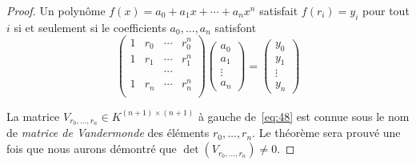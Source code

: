 \begin{proof}
  Un polynôme  $f(x) = a_0 + a_1x + \cdots + a_n x^n$ satisfait $f(r_i) = y_i$ pour tout $i$ si et seulement si le coefficients $a_0,\dots,a_n$ satisfont
  \begin{equation}
    \label{eq:48}
    \begin{pmatrix}
      1 & r_0& \cdots & r_0^n \\
      1 & r_1& \cdots & r_1^n \\
       & &  \cdots  &  \\
       1 & r_n& \cdots & r_n^n \\
     \end{pmatrix}
     \begin{pmatrix}
       a_0\\ a_1 \\ \vdots \\ a_n
     \end{pmatrix} =
     \begin{pmatrix}
       y_0\\ y_1 \\ \vdots \\ y_n
     \end{pmatrix}
   \end{equation}

   La matrice $V_{r_0,\dots,r_n} ∈K^{(n+1)×(n+1)}$  à gauche de~\eqref{eq:48} est connue sous le nom de \emph{matrice de Vandermonde}
   des éléments $r_0,\dots,r_n$. Le théorème sera prouvé une fois que nous aurons démontré que $\det(V_{r_0,\dots,r_n}) ≠0$.


\end{proof}
